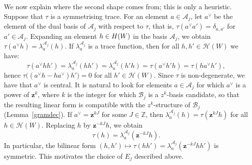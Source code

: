 \documentclass[11pt, reqno]{amsart}
\newcommand{\cH}{\mathcal{H}}
\numberwithin{equation}{section}
\theoremstyle{remark}
\begin{document}
We now explain where the second shape comes from; this is only a
heuristic.
Suppose that $\tau$ is a symmetrising trace. For an element $a\in\mathcal A_j$, let $a^\vee$ be the
element of the dual basis of $\mathcal A_j$ with respect to $\tau$,
that is, $\tau(a^\vee a')=\delta_{a,a'}$ for $a'\in\mathcal A_j$. Expanding an element $h\in\mathcal \cH(W)$ in the basis $\mathcal A_j$, we obtain $
\tau(a^\vee h)=\lambda_a^{\mathcal A_j}(h).
$
If $\lambda_a^{\mathcal A_j}$ is a trace function, then for all $h,h'\in\mathcal H(W)$ we have:
\[
\tau(a^\vee hh')=\lambda_a^{\mathcal A_j}(hh')=\lambda_a^{\mathcal A_j}(h'h)=\tau(a^\vee h'h)=\tau(ha^\vee h'),
\]
hence $\tau\bigl((a^\vee h-ha^\vee)h'\bigr)=0$ for all $h'\in\mathcal H(W)$.
Since $\tau$ is non-degenerate, we have that $a^\vee$ is central. It is natural to look for
elements $a\in\mathcal A_j$ for which $a^\vee$ is a power of $\mathbf z^k$, where $k$ is the
integer for which $\mathcal B_j$ is a $z^k$-basis candidate,
so that the resulting
linear form is compatible with the $z^k$-structure of $\mathcal B_j$ (Lemma~\ref{gramdec}).
If $a^\vee=\mathbf z^{kJ}$ for some $J\in\mathbb Z$, then $\lambda_a^{\mathcal A_j}(h)=\tau(\mathbf z^{kJ}h)$
for all $h\in\mathcal H(W)$. Replacing $h$ by $\mathbf z^{-kJ}h$, we obtain
\[
\tau(h)=\lambda_a^{\mathcal A_j}(\mathbf z^{-kJ}h).
\]
In particular, the bilinear form $(h,h')\mapsto\tau(hh')=\lambda_a^{\mathcal A_j}(\mathbf z^{-kJ}hh')$ is symmetric.
This motivates the choice of $E_j$ described above.
\end{document}
